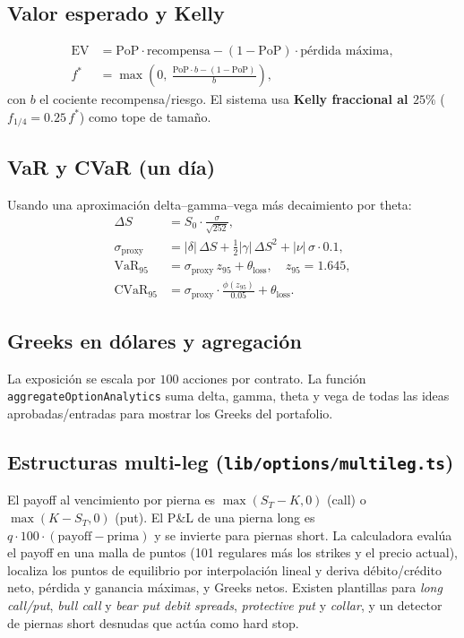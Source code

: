 \documentclass[11pt,letterpaper]{article}
\begin{document}
\subsection{Valor esperado y Kelly}
\begin{align}
\text{EV} &= \text{PoP}\cdot\text{recompensa} - (1-\text{PoP})\cdot\text{pérdida máxima}, \\
f^{*} &= \max\!\left(0,\ \frac{\text{PoP}\cdot b - (1-\text{PoP})}{b}\right),
\end{align}
con $b$ el cociente recompensa/riesgo. El sistema usa \textbf{Kelly fraccional al
$25\%$} ($f_{1/4} = 0.25\,f^{*}$) como tope de tamaño.

\subsection{VaR y CVaR (un día)}
Usando una aproximación delta--gamma--vega más decaimiento por theta:
\begin{align}
\Delta S &= S_0 \cdot \frac{\sigma}{\sqrt{252}}, \\
\sigma_{\text{proxy}} &= |\delta|\,\Delta S + \tfrac{1}{2}|\gamma|\,\Delta S^2 + |\nu|\,\sigma\cdot 0.1, \\
\text{VaR}_{95} &= \sigma_{\text{proxy}}\,z_{95} + \theta_{\text{loss}}, \quad z_{95}=1.645, \\
\text{CVaR}_{95} &= \sigma_{\text{proxy}}\cdot \frac{\phi(z_{95})}{0.05} + \theta_{\text{loss}}.
\end{align}

\subsection{Greeks en dólares y agregación}
La exposición se escala por $100$ acciones por contrato. La función
\texttt{aggregateOptionAnalytics} suma delta, gamma, theta y vega de todas las
ideas aprobadas/entradas para mostrar los Greeks del portafolio.

\subsection{Estructuras multi-leg (\texttt{lib/options/multileg.ts})}
El payoff al vencimiento por pierna es $\max(S_T-K,0)$ (call) o $\max(K-S_T,0)$
(put). El P\&L de una pierna long es $q\cdot 100\cdot(\text{payoff}-\text{prima})$
y se invierte para piernas short. La calculadora evalúa el payoff en una malla de
puntos (101 regulares más los strikes y el precio actual), localiza los puntos de
equilibrio por interpolación lineal y deriva débito/crédito neto, pérdida y
ganancia máximas, y Greeks netos. Existen plantillas para \emph{long call/put},
\emph{bull call} y \emph{bear put debit spreads}, \emph{protective put} y
\emph{collar}, y un detector de piernas short desnudas que actúa como hard stop.
\end{document}
